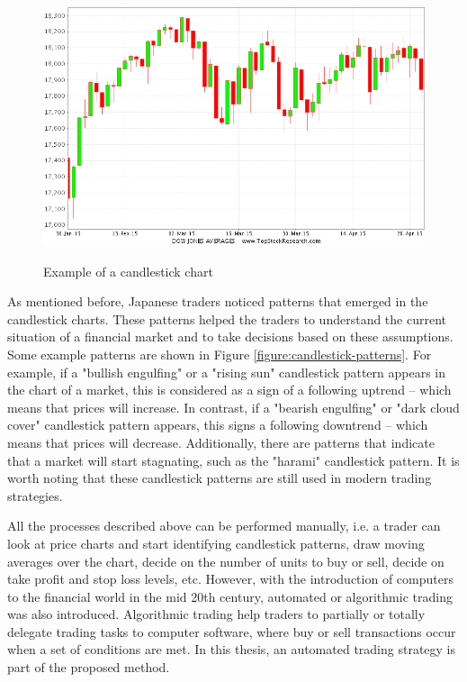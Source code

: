 \begin{figure}
\caption{Example of a candlestick chart}
\centering
\includegraphics[width=1.0\textwidth]{img/candlestick-chart.png}
\label{figure:candlestick-chart}
\end{figure}

As mentioned before, Japanese traders noticed patterns that emerged in the candlestick charts. These patterns helped the traders to understand the current situation of a financial market and to take decisions based on these assumptions. Some example patterns are shown in Figure \ref{figure:candlestick-patterns}. For example, if a "bullish engulfing" or a "rising sun" candlestick pattern appears in the chart of a market, this is considered as a sign of a following uptrend -- which means that prices will increase. In contrast, if a "bearish engulfing" or "dark cloud cover" candlestick pattern appears, this signs a following downtrend -- which means that prices will decrease. Additionally, there are patterns that indicate that a market will start stagnating, such as the "harami" candlestick pattern. It is worth noting that these candlestick patterns are still used in modern trading strategies.

All the processes described above can be performed manually, i.e. a trader can look at price charts and start identifying candlestick patterns, draw moving averages over the chart, decide on the number of units to buy or sell, decide on take profit and stop loss levels, etc. However, with the introduction of computers to the financial world in the mid 20th century, automated or algorithmic trading was also introduced. %
Algorithmic trading help traders to partially or totally delegate trading tasks to computer software, where buy or sell transactions occur when a set of conditions are met. In this thesis, an automated trading strategy is part of the proposed method.

